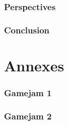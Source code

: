 \documentclass[11pt]{article} %
\begin{document}
	\newpage
	\section{Perspectives}
	
	
	\newpage
	\section{Conclusion}
	

\part{Annexes} \appendix
	\section{Gamejam 1}
	
	
	\section{Gamejam 2}
	
\end{document}
